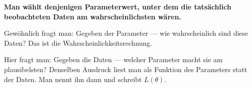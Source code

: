 \begin{merksatz}
\begin{center}
\begin{minipage}{0.9\textwidth}
\textbf{Man wählt denjenigen Parameterwert, unter dem die tatsächlich beobachteten Daten am wahrscheinlichsten wären.}
\end{minipage}
\end{center}

Gewöhnlich fragt man: Gegeben der Parameter --- wie wahrscheinlich sind diese Daten? Das ist die Wahrscheinlichkeitsrechnung.

Hier fragt man: Gegeben die Daten --- welcher Parameter macht sie am plausibelsten? Denselben Ausdruck liest man als Funktion des Parameters statt der Daten. Man nennt ihn dann  und schreibt $L(\theta)$.

\begin{center}
\begin{minipage}{0.88\textwidth}
\end{minipage}
\end{center}
\end{merksatz}

